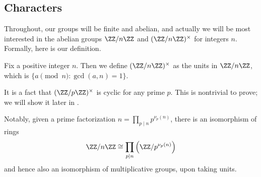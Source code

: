 \documentclass[../notes.tex]{subfiles}
\begin{document}
\subsection{Characters}
Throughout, our groups will be finite and abelian, and actually we will be most interested in the abelian groups $\ZZ/n\ZZ$ and $(\ZZ/n\ZZ)^\times$ for integers $n$. Formally, here is our definition.
\begin{definition}
	Fix a positive integer $n$. Then we define $(\ZZ/n\ZZ)^\times$ as the units in $\ZZ/n\ZZ$, which is $\{a\pmod n:\gcd(a,n)=1\}$.
\end{definition}
\begin{remark}
	It is a fact that $(\ZZ/p\ZZ)^\times$ is cyclic for any prime $p$. This is nontrivial to prove; we will show it later in .
\end{remark}
Notably, given a prime factorization $n=\prod_{p\mid n}p^{\nu_p(n)}$, there is an isomorphism of rings
\[\ZZ/n\ZZ\cong\prod_{p\mid n}\left(\ZZ/p^{\nu_p(n)}\right)\]
and hence also an isomorphism of multiplicative groups, upon taking units.
\end{document}
